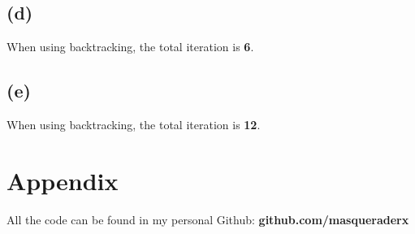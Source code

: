 \documentclass[12pt, a4 paper]{article}
\begin{document}
\begin{framed}
        \subsection{(d)}
        When using backtracking, the total iteration is \textbf{6}.
        
        \subsection{(e)}
        When using backtracking, the total iteration is \textbf{12}. 
    \end{framed}

    \section{Appendix}
    All the code can be found in my personal Github: \textbf{github.com/masqueraderx}
\end{document}
